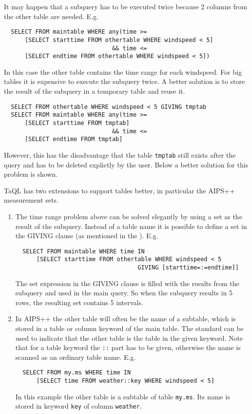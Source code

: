 It may happen that a subquery has to be executed twice because
2 columns from the other table are needed. E.g.
\begin{verbatim}
  SELECT FROM maintable WHERE any(time >=
      [SELECT starttime FROM othertable WHERE windspeed < 5]
                               && time <=
      [SELECT endtime FROM othertable WHERE windspeed < 5])
\end{verbatim}
In this case the other table contains the time range for each windspeed.
For big tables it is expensive to execute the subquery twice.
A better solution
is to store the result of the subquery in a temporary table and reuse it.
\begin{verbatim}
  SELECT FROM othertable WHERE windspeed < 5 GIVING tmptab
  SELECT FROM maintable WHERE any(time >=
      [SELECT starttime FROM tmptab]
                               && time <=
      [SELECT endtime FROM tmptab]
\end{verbatim}
However, this has the disadvantage that the table \texttt{tmptab}
still exists after the query and has to be deleted explictly by the
user. Below a better solution for this problem is shown.

TaQL has two extensions to support tables better,
in particular the AIPS++ measurement sets.
\begin{enumerate}
\item
The time range problem above can be solved elegantly by using
a set as the result of the subquery. Instead of a table name
it is possible to define a set in the GIVING clause (as mentioned
in the ). E.g.
\begin{verbatim}
  SELECT FROM maintable WHERE time IN
      [SELECT starttime FROM othertable WHERE windspeed < 5
                                   GIVING [starttime=:=endtime]]
\end{verbatim}
The set expression in the GIVING clause is filled with the
results from the subquery and used in the main query. So when
the subquery results in 5 rows, the resulting set contains 5
intervals.
\item
In AIPS++ the other table will often be the name of a subtable,
which is stored in a table or column keyword of the main table.
The standard  can be used
to indicate that the other table is the table in the given keyword.
Note that for a table keyword the \texttt{::} part has to be given,
otherwise the name is scanned as an ordinary table name. E.g.
\begin{verbatim}
  SELECT FROM my.ms WHERE time IN
      [SELECT time FROM weather::key WHERE windspeed < 5]
\end{verbatim}
In this example the other table is a subtable of table \texttt{my.ms}.
Its name is stored in keyword \texttt{key} of column
\texttt{weather}.
\end{enumerate}


